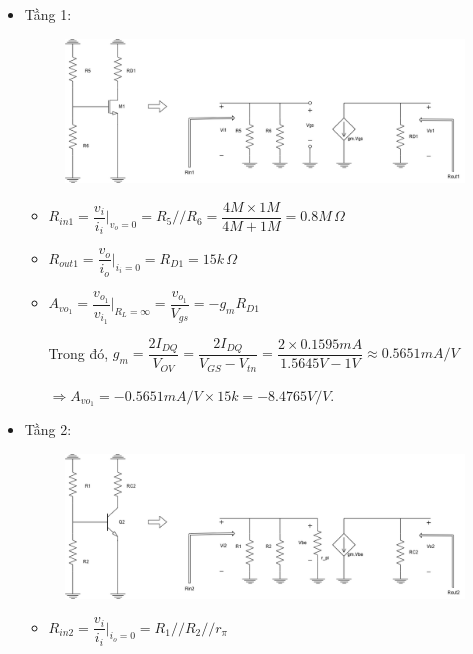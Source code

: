 \begin{itemize}[label=-]
	\item Tầng 1:
	
	\begin{figure}[H]
		\centering
		\includegraphics[width=.7\linewidth]{./my-chapters/my-diagrams/Question6/caub_stage1.png}
	\end{figure}
	
	\begin{itemize}[label = +]
		\item $R_{in1} = \dfrac{v_{i}}{i_{i}}\bigg|_{v_{o}=0} = R_{5} // R_{6} = \dfrac{4M \times 1M}{4M + 1M} = 0.8M \,\Omega$
		\item $R_{out1} = \dfrac{v_{o}}{i_{o}}\bigg|_{i_{i} = 0} = R_{D1} = 15k \,\Omega$
		\item $A_{vo_{1}} = \dfrac{v_{o_{1}}}{v_{i_{1}}}\bigg|_{R_{L} = \infty} = \dfrac{v_{o_{1}}}{V_{gs}} = -g_{m} R_{D1}$
		
		Trong đó, $g_{m} = \dfrac{2I_{DQ}}{V_{OV}} = \dfrac{2I_{DQ}}{V_{GS} - V_{tn}} = \dfrac{2\times 0.1595mA}{1.5645V - 1V} \approx 0.5651 mA/V$
		
		$\Rightarrow A_{vo_{1}} = -0.5651 mA/V \times 15k = -8.4765 V/V $.
	\end{itemize}
	
	\item Tầng 2:
	
	\begin{figure}[H]
		\centering
		\includegraphics[width=.7\linewidth]{./my-chapters/my-diagrams/Question6/caub_stage2.png}
	\end{figure}
	
	\begin{itemize}[label = +]
		\item $R_{in2} = \dfrac{v_{i}}{i_{i}}\bigg|_{i_{o}=0} = R_{1} // R_{2} // r_{\pi}$
		

\end{itemize}
\end{itemize}

